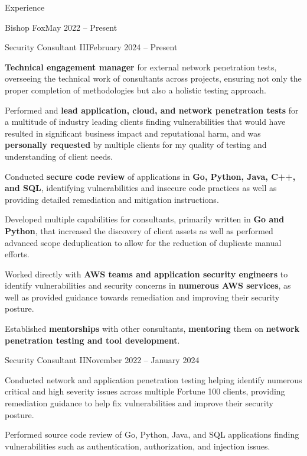 \documentclass{article}
\newlength{\tabin}
\newlength{\secsep}
\newcommand{\lineunder}{\vspace*{-8pt} \\ \hspace*{-6pt} \hrulefill \\ \vspace*{-15pt}}
\newenvironment{tabbedsection}[1]{
  \begin{list}{}{
      \setlength{\itemsep}{0pt}
      \setlength{\labelsep}{0pt}
      \setlength{\labelwidth}{0pt}
      \setlength{\leftmargin}{0pt}
      \setlength{\rightmargin}{\tabin}
      \setlength{\listparindent}{0pt}
      \setlength{\parsep}{0pt}
      \setlength{\parskip}{0pt}
      \setlength{\partopsep}{0pt}
      \setlength{\topsep}{#1}
    }
  \item[]
}{\end{list}}
\newenvironment{resume_section}[1]{
  \needspace{4\baselineskip}
  \vspace{2\secsep}
  \textsc{\color{blue}\large#1}
  \lineunder
  \begin{tabbedsection}{\secsep}
}{\end{tabbedsection}}
\newenvironment{subitems}{
  \renewcommand{\labelitemi}{-}
  \begin{itemize}
      \setlength{\labelsep}{1em}
}{\end{itemize}}
\newenvironment{resume_employer}[3]{
  \vspace{\secsep}
  \textbf{\color{BlueViolet}#1} \hfill {\normalsize \textbf{(#3)}} \hspace{-5em}
  \begin{tabbedsection}{0pt}
    \ifthenelse{\isempty{#2}}%
        {}%
        {\textbf{#2}}%
}{\end{tabbedsection}}
\newenvironment{resume_position}[2]{
    \vspace{\secsep}
    \textbf{#1} \hfill {\normalsize (#2)} \hspace{-2.64em}
    \begin{subitems}
}{\end{subitems}}
\begin{document}
\begin{resume_section}{Experience}
    \begin{resume_employer}{Bishop Fox}{}{May 2022 -- Present}
        \begin{resume_position}{Security Consultant III}{February 2024 -- Present}
            \item \textbf{Technical engagement manager} for external network penetration tests, overseeing the technical work of consultants across projects, ensuring not only the proper completion of methodologies but also a holistic testing approach.
            \item Performed and \textbf{lead application, cloud, and network penetration tests} for a multitude of industry leading clients finding vulnerabilities that would have resulted in significant business impact and reputational harm, and was \textbf{personally requested} by multiple clients for my quality of testing and understanding of client needs.
            \item Conducted \textbf{secure code review} of applications in \textbf{Go, Python, Java, C++, and SQL}, identifying vulnerabilities and insecure code practices as well as providing detailed remediation and mitigation instructions. 
            \item Developed multiple capabilities for consultants, primarily written in \textbf{Go and Python}, that increased the discovery of client assets as well as performed advanced scope deduplication to allow for the reduction of duplicate manual efforts.
            \item Worked directly with \textbf{AWS teams and application security engineers} to identify vulnerabilities and security concerns in \textbf{numerous AWS services}, as well as provided guidance towards remediation and improving their security posture.
            \item Established \textbf{mentorships} with other consultants, \textbf{mentoring} them on \textbf{network penetration testing and tool development}.
        \end{resume_position}
        \begin{resume_position}{Security Consultant II}{November 2022 -- January 2024}
                \item Conducted network and application penetration testing helping identify numerous critical and high severity issues across multiple Fortune 100 clients, providing remediation guidance to help fix vulnerabilities and improve their security posture.
                \item Performed source code review of Go, Python, Java, and SQL applications finding vulnerabilities such as authentication, authorization, and injection issues.

\end{resume_position}
\end{resume_employer}
\end{resume_section}
\end{document}
